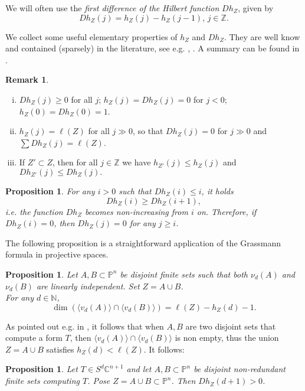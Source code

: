 \documentclass{amsart}
\newcommand{\C}{\mathbb{C}}
\newcommand{\Z}{\mathbb{Z}}
\newcommand{\Pj}{\mathbb{P}}
\newcommand{\N}{\mathbb{N}}
\newtheorem{prop0}[thm0]{Proposition}
\theoremstyle{definition}
\newtheorem{rem0}[thm0]{Remark}
\begin{document}
We will often use the \emph{first difference of the Hilbert function} $ Dh_{Z} $, given by
$$ Dh_{Z}(j) = h_{Z}(j)-h_{Z}(j-1), \,j \in \Z . $$

We collect some useful elementary properties of $ h_{Z} $ and $ Dh_{Z} $. They are well know and contained 
(sparsely) in the literature, see e.g. \cite{IK}, \cite{Migliore}. A summary can be found in \cite{C19}.

\begin{rem0}\label{rem:triv} 
\begin{enumerate}[(i)]
\item $ Dh_{Z}(j) \geq 0 $ for all $ j $; $ h_Z(j)=Dh_{Z}(j) = 0$ for $ j < 0$;  $ h_{Z}(0) = Dh_{Z}(0) = 1$.
\item $ h_{Z}(j) = \ell(Z) $ for all $ j \gg 0$, so that $ Dh_{Z}(j) = 0$ for $ j \gg 0 $ and $ \sum Dh_{Z}(j) = \ell(Z) $.
\item If $ Z' \subset Z $, then for all $ j \in \Z $  we have $ h_{Z'}(j) \leq h_{Z}(j) $ and $Dh_{Z'}(j) \leq Dh_{Z}(j).$
\end{enumerate}
\end{rem0}

\begin{prop0}\label{nonincr}
For any $  i >0 $ such that $ Dh_{Z}(i) \leq i $, it holds 
$$ Dh_{Z}(i) \geq Dh_{Z}(i+1), $$
i.e. the function $Dh_Z$ becomes non-increasing from $i$ on. 
Therefore, if $ Dh_{Z}(i) = 0 $, then $ Dh_{Z}(j) = 0 $ for any $ j \geq i $.
\end{prop0}

The following proposition is a straightforward application of the Grassmann formula in projective spaces.

\begin{prop0}\label{cap} 
Let $A,B\subset \Pj^n$ be disjoint finite sets such that both $\nu_d(A)$ and $\nu_d(B)$ are linearly independent. Set $Z=A\cup B$.\\
For any $d \in \N$, 
$$\dim(\langle v_d(A)\rangle\cap \langle v_d(B)\rangle) =\ell(Z)-h_Z(d)-1.$$
\end{prop0}

As pointed out e.g. in \cite{AngeC}, it follows that when $ A, B$ are two disjoint sets that compute a form $T$,
then $\langle v_d(A)\rangle\cap \langle v_d(B)\rangle$ is non empty, thus the union $Z=A\cup B$ satisfies $h_Z(d)<\ell(Z)$.
It follows:

\begin{prop0}\label{d+1} 
Let $ T \in S^{d}\C^{n+1} $ and let $ A, B \subset \Pj^{n} $ be disjoint non-redundant finite sets computing $ T $. 
Pose $ Z = A \cup B \subset \Pj^{n}$. Then $ Dh_{Z}(d+1) > 0 $.
\end{prop0}
\end{document}
